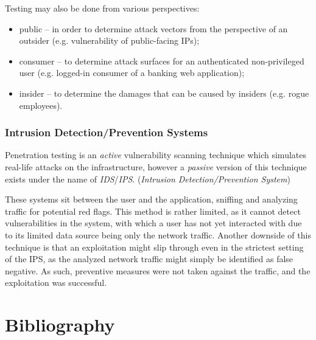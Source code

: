 \documentclass[a4paper,12pt]{article}
\begin{document}
	\noindent Testing may also be done from various perspectives:
	
	\begin{itemize}
		\item public -- in order to determine attack vectors from the perspective of an outsider (e.g. vulnerability of public-facing IPs);
		\item consumer -- to determine attack surfaces for an authenticated non-privileged user (e.g. logged-in consumer of a banking web application);
		\item insider -- to determine the damages that can be caused by insiders (e.g. rogue employees).
	\end{itemize}
	
\subsubsection{Intrusion Detection/Prevention Systems}
	
	Penetration testing is an \textit{active} vulnerability scanning technique which simulates real-life attacks on the infrastructure, however a \textit{passive} version of this technique exists under the name of \textit{IDS}/\textit{IPS}. (\textit{Intrusion Detection/Prevention System})
	
	These systems sit between the user and the application, sniffing and analyzing traffic for potential red flags. This method is rather limited, as it cannot detect vulnerabilities in the system, with which a user has not yet interacted with due to its limited data source being only the network traffic. Another downside of this technique is that an exploitation might slip through even in the strictest setting of the IPS, as the analyzed network traffic might simply be identified as false negative. As such, preventive measures were not taken against the traffic, and the exploitation was successful.
	
\newpage
\section{Bibliography}

	\begingroup
	\renewcommand{\section}[2]{}
	\renewcommand{\markboth}[2]{}
		
		
	\endgroup
\end{document}
